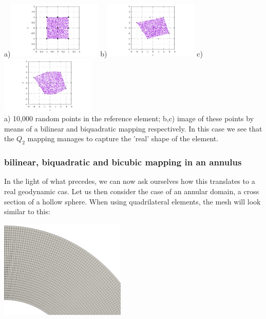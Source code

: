 \begin{center}
a)\includegraphics[width=4.5cm]{images/mappings/biquadratic2/rs.pdf}
b)\includegraphics[width=4.5cm]{images/mappings/biquadratic2/xyQ1.pdf}
c)\includegraphics[width=4.5cm]{images/mappings/biquadratic2/xyQ2.pdf}\\
{\captionfont a) 10,000 random points in the reference element; b,c) image of these points
by means of a bilinear and biquadratic mapping respectively. In this case we see that 
the $Q_2$ mapping manages to capture the 'real' shape of the element.}
\end{center}

\subsubsection{bilinear, biquadratic and bicubic mapping in an annulus }

In the light of what precedes, we can now ask ourselves how this translates to 
a real geodynamic cas. Let us then consider the case of an annular domain, 
a cross section of a hollow sphere. 
When using quadrilateral elements, the mesh will look similar to this:

\begin{center}
\includegraphics[width=6cm]{images/mappings/curved/annulus_mesh}
\end{center}

